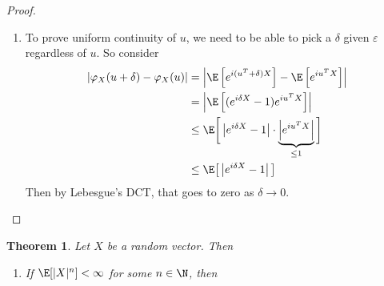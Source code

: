 \documentclass[12pt]{article}
\theoremstyle{plain}
\newtheorem{thm}{Theorem}[section]
\theoremstyle{definition}
\theoremstyle{remark}
\newcommand{\ra}{\rightarrow}
\renewcommand{\Im}{\operatorname{Im}}
\begin{document}
\begin{proof}
\begin{enumerate}[label=(\roman*)]
    ($\Leftarrow$)
    Suppose that $X$ is symmetric so that $X\overset{d}{=}-X$. Then
    again, by Theorem~\ref{thm:charfcnunq}, we have
    have
    \begin{align}
      \varphi_X(u)&=\varphi_{-X}(u) \notag \\
      \iff\quad
      \E\left[e^{iu^TX}\right]
      &= \E\left[e^{-iu^TX}\right]
      \label{charfcnsymmetric}
    \end{align}
    Well then since $\Im(z) = (z - \bar{z})/2i$, we get
    \begin{align*}
      \Im(\varphi_X(u))
      &=
      \frac{\varphi_X(u)-\overline{\varphi_X(u)}}{2i} \\
      &=
      \frac{\E\left[e^{iu^TX}\right]-\E\left[e^{-iu^TX}\right]}{2i} \\
      \text{By (\ref{charfcnsymmetric})}
      \quad\implies\quad
      \Im(\varphi_X(u))
      &=
      0
    \end{align*}
    Hence $\varphi_X(u)$ is real-valued.

  \item To prove uniform continuity of $u$, we need to be able to pick a
    $\delta$ given $\varepsilon$ regardless of $u$. So consider
    \begin{align*}
      \left\lvert
      \varphi_X(u+\delta) - \varphi_X(u)
      \right\rvert
      &=
      \left\lvert
      \E\left[e^{i(u^T+\delta)X}\right] - \E\left[e^{iu^TX}\right]
      \right\rvert \\
      &=
      \left\lvert
      \E\left[(e^{i\delta X}-1)e^{iu^TX}\right]
      \right\rvert \\
      &\leq
      \E\bigg[
      \left\lvert
      e^{i\delta X}-1
      \right\rvert
      \cdot
      \underbrace{\left\lvert e^{iu^TX} \right\rvert}_{\leq 1}
      \bigg]
      \\
      &\leq
      \E\big[
      \left\lvert
      e^{i\delta X}-1
      \right\rvert
      \big]
    \end{align*}
    Then by Lebesgue's DCT, that goes to zero as $\delta\ra 0$.
\end{enumerate}
\end{proof}

\begin{thm}
Let $X$ be a random vector. Then
\begin{enumerate}[label=\emph{(\roman*)}]
  \item If $\E[|X|^n]<\infty$ for some $n\in\N$, then
\end{enumerate}
\end{thm}
\end{document}
